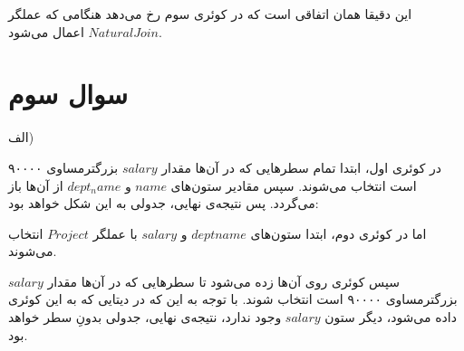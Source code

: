 این دقیقا همان اتفاقی است که در کوئری سوم رخ می‌دهد هنگامی که عملگر
$Natural Join$
اعمال می‌شود.



\section*{\centering سوال سوم}

الف)

در کوئری اول، ابتدا تمام سطرهایی که در آن‌ها مقدار 
$salary$
بزرگترمساوی ۹۰۰۰۰ است انتخاب می‌شوند. سپس مقادیر ستون‌های
$name$
و
$dept_name$
از آن‌ها باز می‌گردد.
پس نتیجه‌ی نهایی، جدولی به این شکل خواهد بود:




\begin{LTRbibitems}


\end{LTRbibitems}


اما در کوئری دوم، ابتدا ستون‌های
$deptname$
و
$salary$
با عملگر
$Project$
انتخاب می‌شوند.

سپس کوئری روی آن‌ها زده می‌شود تا سطرهایی که در آن‌ها مقدار
$salary$
بزرگترمساوی ۹۰۰۰۰ است انتخاب شوند.
با توجه به این که در دیتایی که به این کوئری داده می‌شود، دیگر ستون
$salary$
وجود ندارد، نتیجه‌ی نهایی، جدولی بدونِ سطر خواهد بود.




